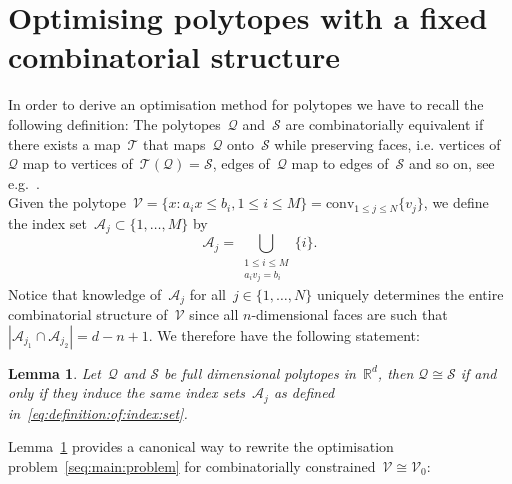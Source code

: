 \documentclass[letterpaper, 10pt, conference]{ieeeconf} %
\newtheorem{thm}{Lemma}[section]
\providecommand{\abs}[1]{\left\lvert#1\right\rvert}
\begin{document}
\section{Optimising polytopes with a fixed combinatorial structure}\label{sec:optimising:polytopes}
%
%
%
\noindent In order to derive an optimisation method for polytopes we have to recall the following definition:
%
The polytopes~$\mathcal Q$ and~$\mathcal S$ are combinatorially equivalent if there exists a map~$\mathcal T$ that maps~$\mathcal Q$ onto~$\mathcal S$ while preserving faces, i.e. vertices of~$\mathcal Q$ map to vertices of~$\mathcal T(\mathcal Q)=\mathcal S$, edges of~$\mathcal Q$ map to edges of~$\mathcal S$ and so on, see e.g.~\cite{Ziegler:1995}.
%
\\[1em]
%
Given the polytope~$\mathcal V = \{x:a_ix\leq b_i,1\leq i\leq M\}=\text{conv}_{1\leq j\leq N}\{v_j\}$, we define the index set~$\mathcal A_j\subset\{1,\dots,M\}$ by
%
\begin{equation}\label{eq:definition:of:index:set}
	\mathcal A_j = \bigcup_{\substack{1\leq i\leq M\\ a_i v_j=b_i}}\{i\}.
\end{equation}
%
Notice that knowledge of~$\mathcal A_j$ for all~$j\in\{1,\dots,N\}$ uniquely determines the entire combinatorial structure of~$\mathcal V$ since all $n$-dimensional faces are such that $\abs{\mathcal A_{j_1}\cap\mathcal A_{j_2}}=d-n+1$.
%
We therefore have the following statement:
%
\begin{thm}\label{thm:combinatorial:equivalence}
Let~$\mathcal Q$ and $\mathcal S$ be full dimensional polytopes in~$\mathbb R^d$, then $\mathcal Q\cong\mathcal S$ if and only if they induce the same index sets~$\mathcal A_j$ as defined in~\eqref{eq:definition:of:index:set}.
\end{thm}
%
Lemma~\ref{thm:combinatorial:equivalence} provides a canonical way to rewrite the optimisation problem~\eqref{seq:main:problem} for combinatorially constrained~$\mathcal V\cong\mathcal V_0$:
%
\end{document}
